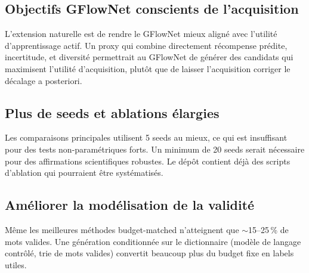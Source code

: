 \documentclass[10pt]{article}
\begin{document}
\subsection{Objectifs GFlowNet conscients de l'acquisition}
L'extension naturelle est de rendre le GFlowNet mieux aligné avec l'utilité d'apprentissage actif. Un proxy qui combine directement récompense prédite, incertitude, et diversité permettrait au GFlowNet de générer des candidats qui maximisent l'utilité d'acquisition, plutôt que de laisser l'acquisition corriger le décalage a posteriori.

\subsection{Plus de seeds et ablations élargies}
Les comparaisons principales utilisent 5 seeds au mieux, ce qui est insuffisant pour des tests non-paramétriques forts. Un minimum de 20 seeds serait nécessaire pour des affirmations scientifiques robustes. Le dépôt contient déjà des scripts d'ablation qui pourraient être systématisés.

\subsection{Améliorer la modélisation de la validité}
Même les meilleures méthodes budget-matched n'atteignent que $\sim$15--25\,\% de mots valides. Une génération conditionnée sur le dictionnaire (modèle de langage contrôlé, trie de mots valides) convertit beaucoup plus du budget fixe en labels utiles.
\end{document}
